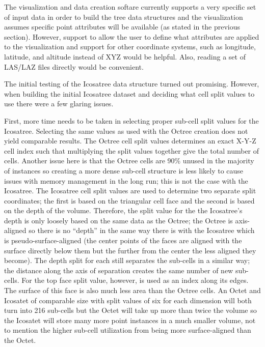 The visualization and data creation softare currently supports a very specific
set of input data in order to build the tree data structures and the
visualization assumes specific point attributes will be available (as stated in
the previous section). However, support to allow the user to define what
attributes are applied to the visualization and support for other coordinate
systems, such as longitude, latitude, and altitude instead of XYZ would be
helpful. Also, reading a set of LAS/LAZ files directly would be convenient.

The initial testing of the Icosatree data structure turned out promising.
However, when building the initial Icosatree dataset and deciding what cell
split values to use there were a few glaring issues.

First, more time needs to be taken in selecting proper sub-cell split values for
the Icosatree. Selecting the same values as used with the Octree creation does
not yield comparable results. The Octree cell split values determines an exact
X-Y-Z cell index such that multiplying the split values together give the total
number of cells. Another issue here is that the Octree cells are 90\% unused in
the majority of instances so creating a more dense sub-cell structure is less
likely to cause issues with memory management in the long run; this is not the
case with the Icosatree. The Icosatree cell split values are used to determine
two separate split coordinates; the first is based on the triangular cell face
and the second is based on the depth of the volume. Therefore, the split value
for the the Icosatree’s depth is only loosely based on the same data as the
Octree; the Octree is axis-aligned so there is no “depth” in the same way there
is with the Icosatree which is pseudo-surface-aligned (the center points of the
faces are aligned with the surface directly below them but the further from the
center the less aligned they become). The depth split for each still separates
the sub-cells in a similar way; the distance along the axis of separation
creates the same number of new sub-cells. For the top face split value, however,
is used as an index along its edges. The surface of this face is also much less
area than the Octree cells. An Octet and Icosatet of comparable size with split
values of six for each dimension will both turn into 216 sub-cells but the Octet
will take up more than twice the volume so the Icosatet will store many more
point instances in a much smaller volume, not to mention the higher sub-cell
utilization from being more surface-aligned than the Octet.


